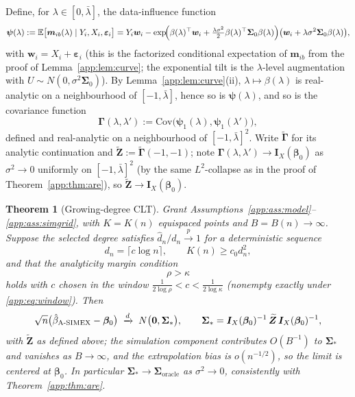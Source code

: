 \documentclass[11pt]{article}
\theoremstyle{plain}
\newtheorem{theorem}{Theorem}
\theoremstyle{definition}
\newcommand{\E}{\mathbb{E}}
\newcommand{\Cov}{\mathrm{Cov}}
\newcommand{\bet}{\bm{\beta}}
\newcommand{\beps}{\bm{\varepsilon}}
\newcommand{\bSig}{\bm{\Sigma}}
\newcommand{\asimex}{\textup{A-SIMEX}}
\begin{document}
Define, for $\lambda\in[0,\bar\lambda]$, the data-influence function
\[
  \bm\psi(\lambda)
  :=\E\bigl[\bm m_{ib}(\lambda)\mid Y_i,X_i,\beps_i\bigr]
  =Y_i\bm w_i
   -\exp\!\Bigl(\beta(\lambda)^\top\bm w_i
   +\tfrac{\lambda\sigma^2}{2}\beta(\lambda)^\top\bSig_0\beta(\lambda)\Bigr)
   \bigl(\bm w_i+\lambda\sigma^2\bSig_0\beta(\lambda)\bigr),
\]
with $\bm w_i=X_i+\beps_i$ (this is the factorized conditional expectation
of $\bm m_{ib}$ from the proof of Lemma~\ref{app:lem:curve}; the exponential
tilt is the $\lambda$-level augmentation with
$U\sim N(0,\sigma^2\bSig_0)$). By Lemma~\ref{app:lem:curve}(ii),
$\lambda\mapsto\beta(\lambda)$ is real-analytic on a neighbourhood of
$[-1,\bar\lambda]$, hence so is $\bm\psi(\lambda)$, and so is the
covariance function
\[
  \bm\Gamma(\lambda,\lambda')
  :=\Cov\bigl(\bm\psi_1(\lambda),\bm\psi_1(\lambda')\bigr),
\]
defined and real-analytic on a neighbourhood of
$[-1,\bar\lambda]^2$. Write $\widetilde{\bm\Gamma}$ for its analytic
continuation and $\widetilde{\bm Z}:=\widetilde{\bm\Gamma}( -1,-1)$;
note $\bm\Gamma(\lambda,\lambda')\to\bm I_X(\bet_0)$ as
$\sigma^2\to0$ uniformly on $[-1,\bar\lambda]^2$ (by the same
$L^2$-collapse as in the proof of Theorem~\ref{app:thm:are}), so
$\widetilde{\bm Z}\to\bm I_X(\bet_0)$.

\begin{theorem}[Growing-degree CLT]\label{app:thm:grow}
Grant Assumptions~\ref{app:ass:model}--\ref{app:ass:simgrid}, with $K=K(n)$
equispaced points and $B=B(n)\to\infty$. Suppose the selected degree
satisfies $\hat d_n/d_n\xrightarrow{p}1$ for a deterministic sequence
\[
  d_n=\lceil c\log n\rceil,
  \qquad K(n)\ge c_0d_n^2,
\]
and that the analyticity margin condition
\begin{equation}\label{app:eq:window}
  \rho>\kappa
\end{equation}
holds with $c$ chosen in the window
$\tfrac{1}{2\log\rho}<c<\tfrac{1}{2\log\kappa}$ (nonempty exactly under
\eqref{app:eq:window}). Then
\[
  \sqrt n\bigl(\hat\beta_{\asimex}-\bet_0\bigr)
  \;\xrightarrow{d}\;N\bigl(\bm 0,\bSig_*\bigr),
  \qquad
  \bSig_*=\bm I_X(\bet_0)^{-1}\,\widetilde{\bm Z}\,
           \bm I_X(\bet_0)^{-1},
\]
with $\widetilde{\bm Z}$ as defined above; the simulation component
contributes $O(B^{-1})$ to $\bSig_*$ and vanishes as $B\to\infty$, and
the extrapolation bias is $o(n^{-1/2})$, so the limit is centered at
$\bet_0$. In particular $\bSig_*\to\bSig_{\mathrm{oracle}}$ as
$\sigma^2\to0$, consistently with Theorem~\ref{app:thm:are}.
\end{theorem}
\end{document}
